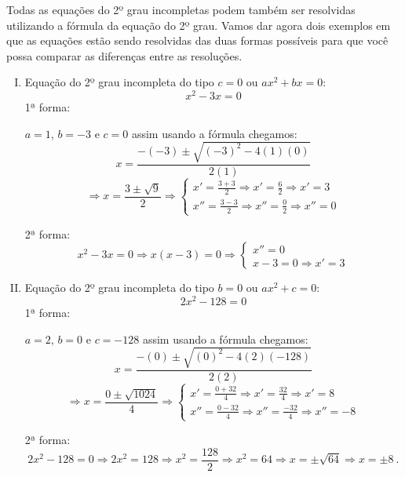 \begin{exem} Todas as equações do 2º grau incompletas podem também ser resolvidas utilizando a fórmula da equação do 2º grau. Vamos dar agora dois exemplos em que as equações estão sendo resolvidas das duas formas possíveis para que você possa comparar as diferenças entre as resoluções.

 \begin{enumerate}[I)]

  \item Equação do 2º grau incompleta do tipo $c=0$ ou $ax^2 + bx = 0$:
  \[x^2 - 3x = 0\]
  1ª forma:

  $a = 1$, $b = -3$ e $c = 0$ assim usando a fórmula chegamos:
  \[x = \frac{- (-3) \pm \sqrt{(-3)^2 - 4 (1)(0)}}{2 (1)}\]
  \[\Rightarrow x = \frac{3 \pm \sqrt{9}}{2} \Rightarrow \begin{cases}
                                                          x' = \frac{3 + 3}{2} \Rightarrow x' = \frac{6}{2} \Rightarrow x' = 3 \\
                                                          x'' = \frac{3 - 3}{2} \Rightarrow x''= \frac{0}{2} \Rightarrow x''= 0
                                                         \end{cases}\]

  2ª forma:
  \[x^2 - 3x = 0 \Rightarrow x(x - 3)=0 \Rightarrow \begin{cases}
                                                     x''= 0 \\
                                                     x - 3 = 0 \Rightarrow x' = 3
                                                    \end{cases}\]


  \item Equação do 2º grau incompleta do tipo $b=0$ ou $ax^2 + c = 0$:
  \[2x^2 - 128 = 0\]
  1ª forma:

  $a = 2$, $b = 0$ e $c = -128$ assim usando a fórmula chegamos:
  \[x = \frac{- (0) \pm \sqrt{(0)^2 - 4 (2)(-128)}}{2 (2)}\]
  \[\Rightarrow x = \frac{0 \pm \sqrt{1024}}{4} \Rightarrow \begin{cases}
                                                          x' = \frac{ 0 + 32}{4} \Rightarrow x' = \frac{32}{4} \Rightarrow x' = 8 \\
                                                          x'' = \frac{0 - 32}{4} \Rightarrow x''= \frac{-32}{4} \Rightarrow x''= -8
                                                         \end{cases}\]


  2ª forma:
  \[2x^2 - 128 = 0 \Rightarrow 2x^2 = 128 \Rightarrow x^2 = \frac{128}{2} \Rightarrow x^2 = 64 \Rightarrow x = \pm \sqrt{64} \Rightarrow x = \pm 8 \ .\]
  \end{enumerate}
\end{exem}

